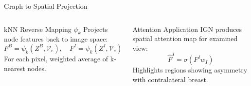 \documentclass[8pt,aspectratio=169,xcolor=dvipsnames]{beamer}
\begin{document}
\begin{frame}{Graph to Spatial Projection}
\begin{columns}
        \begin{block}{kNN Reverse Mapping $\psi_k$}
        Projects node features back to image space:
        \[
        F^B = \psi_k(Z^B, \mathcal{V}_e), \quad F^I = \psi_k(Z^I, \mathcal{V}_e)
        \]
        For each pixel, weighted average of k-nearest nodes.
        \end{block}
        
        \begin{alertblock}{Attention Application}
        IGN produces spatial attention map for examined view:
        \[
        \hat{F}^I = \sigma(F^I w_I)
        \]
        Highlights regions showing asymmetry with contralateral breast.
        \end{alertblock}
    \end{columns}
\end{frame}
\end{document}
